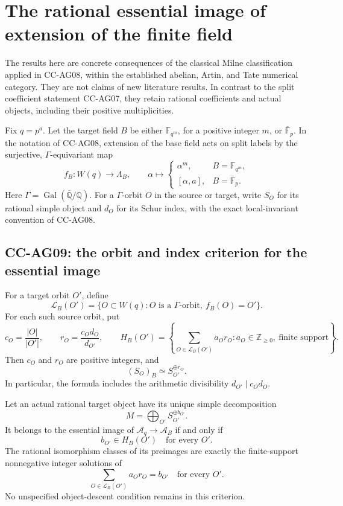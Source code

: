\section{The rational essential image of extension of the finite field}

The results here are concrete consequences of the classical
Milne classification applied in CC-AG08, within the established
abelian, Artin, and Tate numerical category.  They are not
claims of new literature results.  In contrast to the split
coefficient statement CC-AG07, they retain rational
coefficients and actual objects, including their positive
multiplicities.

Fix \(q=p^a\).  Let the target field \(B\) be either
\(\mathbb F_{q^m}\), for a positive integer \(m\), or
\(\overline{\mathbb F}_p\).  In the notation of CC-AG08,
extension of the base field acts on split labels by the
surjective, \(\Gamma\)-equivariant map
\[
 f_B:W(q)\longrightarrow\Lambda_B,\qquad
 \alpha\longmapsto
 \begin{cases}
       \alpha^m,& B=\mathbb F_{q^m},\\
       [\alpha,a],& B=\overline{\mathbb F}_p.
 \end{cases}                                                   \tag{CC-AG.34}
\]
Here \(\Gamma=\operatorname{Gal}(\overline{\mathbb Q}/\mathbb Q)\).
For a \(\Gamma\)-orbit \(O\) in the source or target, write
\(S_O\) for its rational simple object and \(d_O\) for its
Schur index, with the exact local-invariant convention of
CC-AG08.

\subsection{CC-AG09: the orbit and index criterion for the essential image}

For a target orbit \(O'\), define
\[
 \mathscr L_B(O')=
   \{O\subset W(q): O\text{ is a }\Gamma\text{-orbit},
                         \ f_B(O)=O'\}.
\]
For each such source orbit, put
\[
 c_O=\frac{|O|}{|O'|},\qquad
 r_O=\frac{c_Od_O}{d_{O'}},\qquad
 H_B(O')=\left\{\sum_{O\in\mathscr L_B(O')}a_Or_O:
       a_O\in\mathbb Z_{\ge0},\ \text{finite support}\right\}.
                                                               \tag{CC-AG.35}
\]
Then \(c_O\) and \(r_O\) are positive integers, and
\[
             (S_O)_B\simeq S_{O'}^{\oplus r_O}.                \tag{CC-AG.36}
\]
In particular, the formula includes the arithmetic divisibility
\(d_{O'}\mid c_Od_O\).

Let an actual rational target object have its unique simple
decomposition
\[
                       M=\bigoplus_{O'}S_{O'}^{\oplus b_{O'}}.
                                                               \tag{CC-AG.37}
\]
It belongs to the essential image of
\(\mathcal A_q\to\mathcal A_B\) if and only if
\[
                         b_{O'}\in H_B(O')
                       \quad\text{for every }O'.              \tag{CC-AG.38}
\]
The rational isomorphism classes of its preimages are exactly
the finite-support nonnegative integer solutions of
\[
                  \sum_{O\in\mathscr L_B(O')}a_Or_O=b_{O'}
                      \quad\text{for every }O'.               \tag{CC-AG.39}
\]
No unspecified object-descent condition remains in this
criterion.

